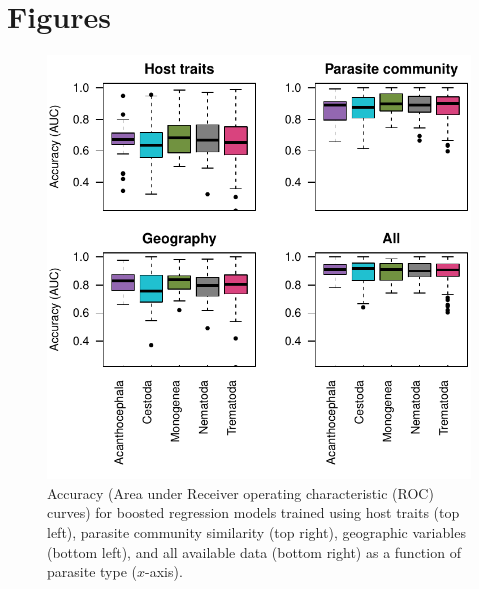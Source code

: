 \documentclass[12pt]{article}
\begin{document}
\section{Figures}
\begin{figure}[h]
  \includegraphics[width=\textwidth]{../Figures/parAccuracy.pdf}
  \caption{Accuracy (Area under Receiver operating characteristic (ROC) curves) for boosted regression models trained using host traits (top left), parasite community similarity (top right), geographic variables (bottom left), and all available data (bottom right) as a function of parasite type ($x$-axis). }
 \label{fig:parAUC}
 \end{figure}

 
  
\end{document}
